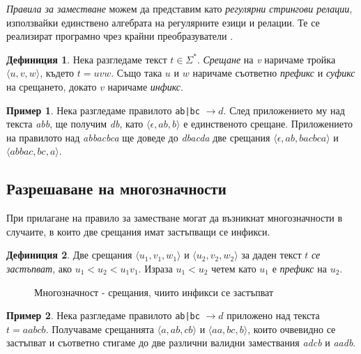 \documentclass[12pt, oneside]{article}
\theoremstyle{definition}
\newtheorem{definition}{Дефиниция}[section]
\newtheorem{example}{Пример}[section]
\begin{document}
\noindent \emph{Правила за заместване} можем да представим като \emph{регулярни стрингови релации}, използвайки единствено алгебрата на регулярните езици и релации. Те се реализират програмно чрез крайни преобразуватели \cite{Kaplan&Kay:94}.

\begin{definition}
	Нека разгледаме текст \( t \in \Sigma^* \). \emph{Срещане} на \emph{v} наричаме тройка \( \langle u,v,w \rangle \), където \( t = uvw \). Също така \( u \) и \( w \) наричаме съответно \emph{префикс} и \emph{суфикс} на срещането, докато \( v \) наричаме \emph{инфикс}.
\end{definition}

\begin{example}
	Нека разгледаме правилото \verb/ab|bc/ \( \to d \). След приложението му над текста \emph{abb}, ще получим \emph{db}, като \( \langle \epsilon, ab, b \rangle \) е единственото срещане. Приложението на правилото над \emph{abbacbca} ще доведе до \emph{dbacda} две срещания \( \langle \epsilon, ab, bacbca \rangle \) и \( \langle abbac, bc, a \rangle \).
\end{example}

\subsection{Разрешаване на многозначности}

При прилагане на правило за заместване могат да възникнат многозначности в случаите, в които две срещания имат застъпващи се инфикси.

\begin{definition}
	Две срещания \( \langle u_1,v_1,w_1 \rangle \) и \( \langle u_2,v_2,w_2 \rangle \) за даден текст \( t \) \emph{се застъпват}, ако \( u_1 < u_2 < u_1v_1 \). Израза \( u_1 < u_2 \) четем като \( u_1 \) е \emph{префикс} на \( u_2 \).
\end{definition}

\begin{figure}[!htb]
	\centering
	
	\caption{Многозначност - срещания, чиито инфикси се застъпват}
\end{figure}

\begin{example}
	Нека разгледаме правилото \verb/ab|bc/ \( \to d \) приложено над текста \( t = aabcb \). Получаваме срещанията \( \langle a, ab, cb \rangle \) и \( \langle aa, bc, b \rangle \), които очвевидно се застъпват и съответно стигаме до две различни валидни замествания \emph{adcb} и \emph{aadb}.
\end{example}
\end{document}
